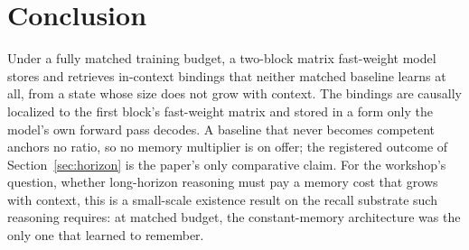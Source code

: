 \section{Conclusion}

Under a fully matched training budget, a two-block matrix fast-weight
model stores and retrieves in-context bindings that neither matched
baseline learns at all, from a state whose size does not grow with
context. The bindings are causally localized to the first block's
fast-weight matrix and stored in a form only the model's own forward
pass decodes. A baseline that never becomes competent anchors no ratio,
so no memory multiplier is on offer; the registered outcome of
Section~\ref{sec:horizon} is the paper's only comparative claim. For the
workshop's question, whether long-horizon reasoning must pay a memory
cost that grows with context, this is a small-scale existence result on
the recall substrate such reasoning requires: at matched budget, the
constant-memory architecture was the only one that learned to remember.
